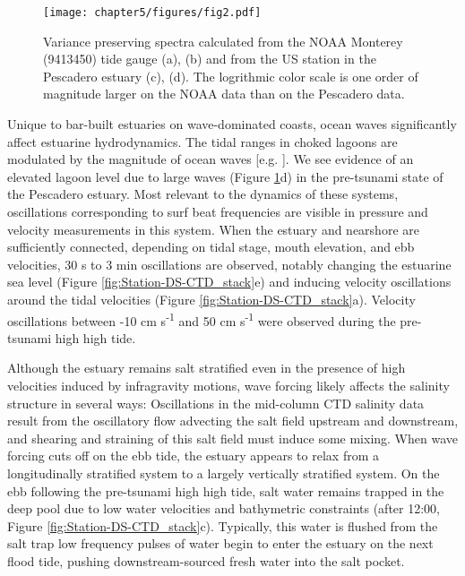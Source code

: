 

\begin{figure}
\centering
\textsf{\texttt{[image: chapter5/figures/fig2.pdf]}}

\protect\caption{Variance preserving spectra calculated from the NOAA Monterey (9413450)
tide gauge (a), (b) and from the US station in the Pescadero estuary
(c), (d).  The logrithmic color scale is one order of magnitude larger
on the NOAA data than on the Pescadero data.\label{fig:Pescadero-stacked-variance_presreving_spectra}}
\end{figure}

Unique to bar-built estuaries on wave-dominated coasts, ocean waves
significantly affect estuarine hydrodynamics. The tidal ranges in
choked lagoons are modulated by the magnitude of ocean waves {[}e.g.
\cite{malhadas_effect_2009}{]}. We see evidence of an elevated
lagoon level due to large waves (Figure \ref{fig:Pescadero-stacked-variance_presreving_spectra}d)
in the pre-tsunami state of the Pescadero estuary. Most relevant to
the dynamics of these systems, oscillations corresponding to surf
beat frequencies are visible in pressure and velocity measurements
in this system. When the estuary and nearshore are sufficiently connected,
depending on tidal stage, mouth elevation, and ebb velocities, 30
s to 3 min oscillations are observed, notably changing the estuarine
sea level (Figure \ref{fig:Station-DS-CTD_stack}e) and inducing velocity
oscillations around the tidal velocities (Figure \ref{fig:Station-DS-CTD_stack}a).
Velocity oscillations between -10 cm s\textsuperscript{-1} and 50
cm s\textsuperscript{-1} were observed during the pre-tsunami high
high tide. 

Although the estuary remains salt stratified even in the presence
of high velocities induced by infragravity motions, wave forcing likely
affects the salinity structure in several ways: Oscillations in the
mid-column CTD salinity data result from the oscillatory flow advecting
the salt field upstream and downstream, and shearing and straining
of this salt field must induce some mixing. When wave forcing cuts
off on the ebb tide, the estuary appears to relax from a longitudinally
stratified system to a largely vertically stratified system. On the
ebb following the pre-tsunami high high tide, salt water remains trapped
in the deep pool due to low water velocities and bathymetric constraints
(after 12:00, Figure \ref{fig:Station-DS-CTD_stack}c). Typically,
this water is flushed from the salt trap low frequency pulses of water
begin to enter the estuary on the next flood tide, pushing downstream-sourced
fresh water into the salt pocket. 


